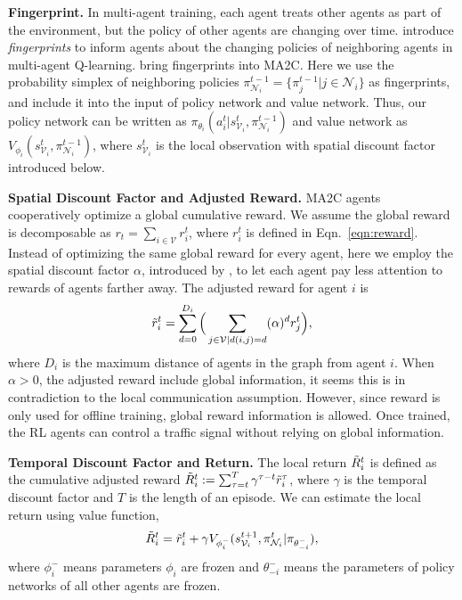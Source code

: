 
\textbf{Fingerprint.} In multi-agent training, each agent treats other agents as part of the environment, but the policy of other agents are changing over time. \cite{foerster2017stabilising} introduce \emph{fingerprints} to inform agents about the changing policies of neighboring agents in multi-agent Q-learning. \cite{chu2019multi} bring fingerprints into MA2C. Here we use the probability simplex of neighboring policies $\pi^{t-1}_{\mathcal{N}_i} = \{\pi^{t-1}_j|j\in \mathcal{N}_i\}$ as fingerprints, and include it into the input of policy network and value network. Thus, our policy network can be written as $\pi_{\theta_i}(a_i^t|s^t_{\mathcal{V}_i}, \pi^{t-1}_{\mathcal{N}_i})$ and value network as $V_{\phi_i}(s^t_{\mathcal{V}_i}, \pi^{t-1}_{\mathcal{N}_i})$, where $s^t_{\mathcal{V}_i}$ is the local observation with spatial discount factor introduced below.

\textbf{Spatial Discount Factor and Adjusted Reward.} MA2C agents cooperatively optimize a global cumulative reward. We assume the global reward is decomposable as $r_t = \sum_{i\in \mathcal{V}} r^t_i$, where $r^t_i$ is defined in Eqn.~\eqref{eqn:reward}. Instead of optimizing the same global reward for every agent, here we employ the spatial discount factor $\alpha$, introduced by \cite{chu2019multi}, to let each agent pay less attention to rewards of agents farther away. The adjusted reward for agent $i$ is 
\begin{equation}
    \Tilde{r}_i^t = \sum_{d=0}^{D_i}\Big( \sum_{j\in\mathcal{V}|d(i, j)=d} (\alpha)^d r^t_j\Big),
\end{equation}
where $D_i$ is the maximum distance of agents in the graph from agent $i$. When $\alpha > 0$, the adjusted reward include global information, it seems this is in contradiction to the local communication assumption. However, since reward is only used for offline training, global reward information is allowed. Once trained, the RL agents can control a traffic signal without relying on global information. 

\textbf{Temporal Discount Factor and Return.} 
The local return $\Tilde{R}^t_i$ is defined as the cumulative adjusted reward $\Tilde{R}^t_i := \sum_{\tau=t}^T \gamma^{\tau-t} \Tilde{r}^\tau_i$, where $\gamma$ is the temporal discount factor and $T$ is the length of an episode. We can estimate the local return using value function,
\begin{equation}
    \Tilde{R}^t_i = \Tilde{r}^t_i + \gamma V_{\phi_i^-}(s^{t+1}_{\mathcal{V}_i}, \pi^{t}_{\mathcal{N}_i}|\pi_{\theta_{-i}^-}),
\end{equation}
where $\phi_i^-$ means parameters $\phi_i$ are frozen and $\theta_{-i}^-$ means the parameters of policy networks of all other agents are frozen. 

